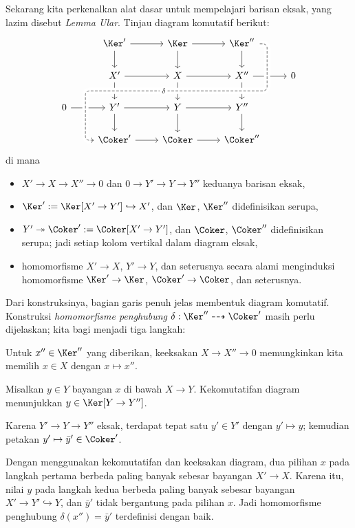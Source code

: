 Sekarang kita perkenalkan alat dasar untuk mempelajari barisan eksak, yang lazim disebut \emph{Lemma Ular}. Tinjau diagram komutatif berikut:
\[\begin{tikzcd}
	& \Ker' \arrow[r] \arrow[d] & \Ker \arrow[r] \arrow[d] & \Ker'' \arrow[d] & \\
	& X' \arrow[d] \arrow[r]  & X \arrow[d] \arrow[r]  & X'' \arrow[r] \arrow[d, ""{coordinate, name=Z}] & 0  \\
	0 \arrow[r] & Y' \arrow[r] \arrow[d] & Y \arrow[r] \arrow[d] & Y'' \arrow[d] & \\
	& \Coker' \arrow[uuurr, "\delta" description, crossing over, dashed, leftarrow, rounded corners, to path= {-- ([xshift=-2ex]\tikztostart.west) |- (Z) [near end]\tikztonodes -| ([xshift=2ex]\tikztotarget.east) -- (\tikztotarget) } ] \arrow[r] & \Coker \arrow[r] & \Coker'' &
\end{tikzcd}\]
di mana
\begin{itemize}
	\item $X' \to X \to X'' \to 0$ dan $0 \to Y' \to Y \to Y''$ keduanya barisan eksak,
	\item $\Ker' := \Ker[X' \to Y'] \hookrightarrow X'$, dan $\Ker$, $\Ker''$ didefinisikan serupa,
	\item $Y' \twoheadrightarrow \Coker' := \Coker[X' \to Y']$, dan $\Coker$, $\Coker''$ didefinisikan serupa; jadi setiap kolom vertikal dalam diagram eksak,
	\item homomorfisme $X' \to X$, $Y' \to Y$, dan seterusnya secara alami menginduksi homomorfisme $\Ker' \to \Ker$, $\Coker' \to \Coker$, dan seterusnya.
\end{itemize}
Dari konstruksinya, bagian garis penuh jelas membentuk diagram komutatif. Konstruksi \emph{homomorfisme penghubung} $\delta: \Ker'' \dashrightarrow \Coker'$ masih perlu dijelaskan; kita bagi menjadi tiga langkah:
\begin{compactenum}[(i)]
	\item Untuk $x'' \in \Ker''$ yang diberikan, keeksakan $X \to X'' \to 0$ memungkinkan kita memilih $x \in X$ dengan $x \mapsto x''$.
	\item Misalkan $y \in Y$ bayangan $x$ di bawah $X \to Y$. Kekomutatifan diagram menunjukkan $y \in \Ker[Y \to Y'']$.
	\item Karena $Y' \to Y \to Y''$ eksak, terdapat tepat satu $y' \in Y'$ dengan $y' \mapsto y$; kemudian petakan $y' \mapsto \bar{y}' \in \Coker'$.
\end{compactenum}
Dengan menggunakan kekomutatifan dan keeksakan diagram, dua pilihan $x$ pada langkah pertama berbeda paling banyak sebesar bayangan $X' \to X$. Karena itu, nilai $y$ pada langkah kedua berbeda paling banyak sebesar bayangan $X' \to Y' \hookrightarrow Y$, dan $\bar{y}'$ tidak bergantung pada pilihan $x$. Jadi homomorfisme penghubung $\delta(x'') = \bar{y}'$ terdefinisi dengan baik.

